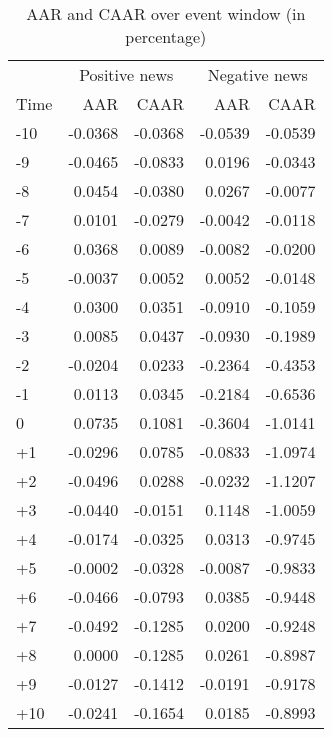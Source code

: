 \begin{table}[ht]
\centering
\begin{tabular}{lrrrr}
  \hline
   & \multicolumn{2}{c}{Positive news} & \multicolumn{2}{c}{Negative news}  \\
  Time & AAR & CAAR & AAR & CAAR \\
 \hline
-10 & -0.0368 & -0.0368 & -0.0539 & -0.0539 \\ 
  -9 & -0.0465 & -0.0833 & 0.0196 & -0.0343 \\ 
  -8 & 0.0454 & -0.0380 & 0.0267 & -0.0077 \\ 
  -7 & 0.0101 & -0.0279 & -0.0042 & -0.0118 \\ 
  -6 & 0.0368 & 0.0089 & -0.0082 & -0.0200 \\ 
  -5 & -0.0037 & 0.0052 & 0.0052 & -0.0148 \\ 
  -4 & 0.0300 & 0.0351 & -0.0910 & -0.1059 \\ 
  -3 & 0.0085 & 0.0437 & -0.0930 & -0.1989 \\ 
  -2 & -0.0204 & 0.0233 & -0.2364 & -0.4353 \\ 
  -1 & 0.0113 & 0.0345 & -0.2184 & -0.6536 \\ 
  0 & 0.0735 & 0.1081 & -0.3604 & -1.0141 \\ 
  +1 & -0.0296 & 0.0785 & -0.0833 & -1.0974 \\ 
  +2 & -0.0496 & 0.0288 & -0.0232 & -1.1207 \\ 
  +3 & -0.0440 & -0.0151 & 0.1148 & -1.0059 \\ 
  +4 & -0.0174 & -0.0325 & 0.0313 & -0.9745 \\ 
  +5 & -0.0002 & -0.0328 & -0.0087 & -0.9833 \\ 
  +6 & -0.0466 & -0.0793 & 0.0385 & -0.9448 \\ 
  +7 & -0.0492 & -0.1285 & 0.0200 & -0.9248 \\ 
  +8 & 0.0000 & -0.1285 & 0.0261 & -0.8987 \\ 
  +9 & -0.0127 & -0.1412 & -0.0191 & -0.9178 \\ 
  +10 & -0.0241 & -0.1654 & 0.0185 & -0.8993 \\ 
   \hline
\end{tabular}
\caption{AAR and CAAR over event window (in percentage)} 
\end{table}

